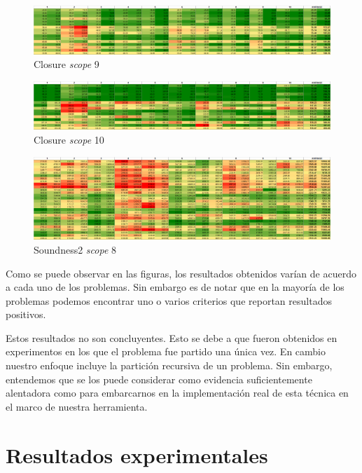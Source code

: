 \begin{figure}
	\includegraphics[width=\textwidth]{resultados/k9_percha.png}
	\caption{Closure \emph{scope} 9}
\end{figure}

\begin{figure}
	\includegraphics[width=\textwidth]{resultados/k10_percha.png}
	\caption{Closure \emph{scope} 10}
\end{figure}

\begin{figure}
	\includegraphics[width=\textwidth]{resultados/soundness8_percha.png}
	\caption{Soundness2 \emph{scope} 8}
	\label{perchasound8}
\end{figure}

Como se puede observar en las figuras, los resultados obtenidos varían de
acuerdo a cada uno de los problemas. Sin embargo es de notar que en la mayoría
de los problemas podemos encontrar uno o varios criterios que reportan
resultados positivos.

Estos resultados no son concluyentes. Esto se debe a que fueron obtenidos en
experimentos en los que el problema fue partido una única vez. En cambio
nuestro enfoque incluye la partición recursiva de un problema. Sin embargo,
entendemos que se los puede considerar como evidencia suficientemente
alentadora como para embarcarnos en la implementación real de esta técnica en
el marco de nuestra herramienta.

\section{Resultados experimentales}

